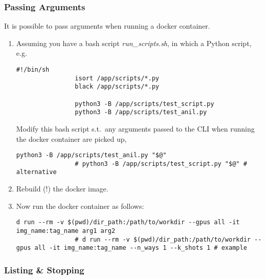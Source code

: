 \documentclass[12pt, a4paper]{article}
\numberwithin{equation}{section}
\theoremstyle{definition}
\theoremstyle{definition}
\begin{document}
		\subsubsection{Passing Arguments}
		
		It is possible to pass arguments when running a docker container. 
		
		\begin{enumerate}
			\item Assuming you have a bash script \textit{run\_scripts.sh}, in which a Python script, e.g.
			
			\begin{lstlisting}[style=mystylebash, label=alg:docker_run__pass_arguments, xleftmargin=\parindent]
				#!/bin/sh
				isort /app/scripts/*.py
				black /app/scripts/*.py
				
				python3 -B /app/scripts/test_script.py
				python3 -B /app/scripts/test_anil.py
			\end{lstlisting}
			
			Modify this bash script s.t.~any arguments passed to the CLI when running the docker container are picked up,
			
			\begin{lstlisting}[style=mystylebash, label=alg:docker_run__pass_arguments_mod, xleftmargin=\parindent]
				python3 -B /app/scripts/test_anil.py "$@"
				# python3 -B /app/scripts/test_script.py "$@" # alternative
			\end{lstlisting}
		
			\item Rebuild (!) the docker image.
			
			\item Now run the docker container as follows:
			
			\begin{lstlisting}[style=mystylebash, label=alg:docker_run__pass_arguments_container, xleftmargin=\parindent]
				d run --rm -v $(pwd)/dir_path:/path/to/workdir --gpus all -it img_name:tag_name arg1 arg2
				# d run --rm -v $(pwd)/dir_path:/path/to/workdir --gpus all -it img_name:tag_name --n_ways 1 --k_shots 1 # example
			\end{lstlisting}
			
		\end{enumerate}
	
	\subsubsection{Listing \& Stopping}
	
\end{document}

